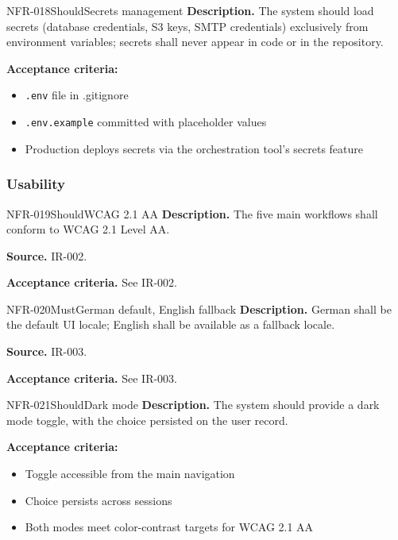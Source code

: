 \documentclass[11pt,a4paper]{article}
\begin{document}
\begin{requirement}{NFR-018}{Should}{Secrets management}
\textbf{Description.} The system should load secrets (database credentials, S3 keys, SMTP credentials) exclusively from environment variables; secrets shall never appear in code or in the repository.

\textbf{Acceptance criteria:}
\begin{itemize}
    \item \texttt{.env} file in .gitignore
    \item \texttt{.env.example} committed with placeholder values
    \item Production deploys secrets via the orchestration tool's secrets feature
\end{itemize}
\end{requirement}

\subsubsection{Usability}

\begin{requirement}{NFR-019}{Should}{WCAG 2.1 AA}
\textbf{Description.} The five main workflows shall conform to WCAG 2.1 Level AA.

\textbf{Source.} IR-002.

\textbf{Acceptance criteria.} See IR-002.
\end{requirement}

\begin{requirement}{NFR-020}{Must}{German default, English fallback}
\textbf{Description.} German shall be the default UI locale; English shall be available as a fallback locale.

\textbf{Source.} IR-003.

\textbf{Acceptance criteria.} See IR-003.
\end{requirement}

\begin{requirement}{NFR-021}{Should}{Dark mode}
\textbf{Description.} The system should provide a dark mode toggle, with the choice persisted on the user record.

\textbf{Acceptance criteria:}
\begin{itemize}
    \item Toggle accessible from the main navigation
    \item Choice persists across sessions
    \item Both modes meet color-contrast targets for WCAG 2.1 AA
\end{itemize}
\end{requirement}
\end{document}

